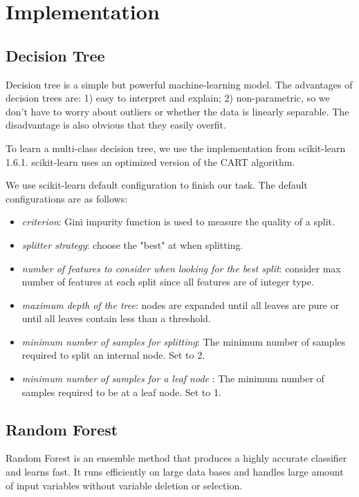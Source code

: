 \documentclass[letterpaper,11pt,twocolumn]{article}
\begin{document}
\section{Implementation}
\label{sec:impl}
\subsection{Decision Tree}
Decision tree is a simple but powerful machine-learning model. The advantages of decision trees are: 1) easy to interpret and explain; 2) non-parametric, so we don't have to worry about outliers or whether the data is linearly separable. The disadvantage is also obvious that they easily overfit.

To learn a multi-class decision tree, we use the implementation from scikit-learn 1.6.1\cite{scikit}. scikit-learn uses an optimized version of the CART algorithm.

We use scikit-learn default configuration to finish our task. The default configurations are as follows:

\begin{itemize}
\item \emph{criterion}: Gini impurity function is used to measure the quality of a split.
\item \emph{splitter strategy}: choose the "best" at when splitting.
\item \emph{number of features to consider when looking for the best split}: consider max number of features at each split since all features are of integer type.
\item \emph{maximum depth of the tree}: nodes are expanded until all leaves are pure or until all leaves contain less than a threshold.
\item \emph{minimum number of samples for splitting}: The minimum number of samples required to split an internal node. Set to 2.
\item \emph{minimum number of samples for a leaf node }: The minimum number of samples required to be at a leaf node. Set to 1.

\end{itemize}
\subsection{Random Forest}
Random Forest is an ensemble method that produces a highly accurate classifier and learns fast. It runs efficiently on large data bases and handles large amount of input variables without variable deletion or selection.
\end{document}
